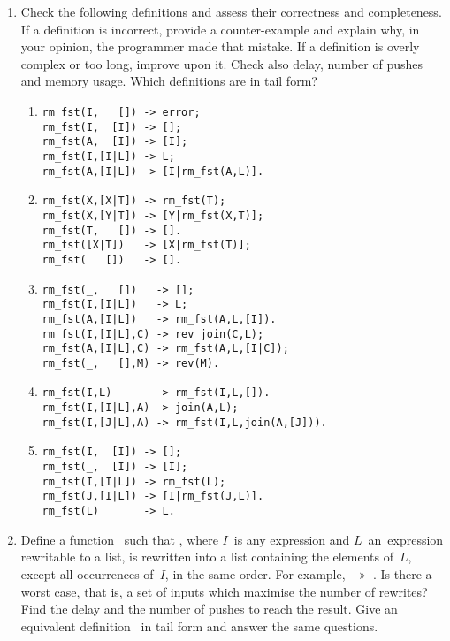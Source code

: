 \begin{enumerate}
  \item Check the following definitions and assess their correctness
    and completeness. If a definition is incorrect, provide a
    counter\hyp{}example and explain why, in your opinion, the
    programmer made that mistake. If a definition is overly complex or
    too long, improve upon it. Check also delay, number of pushes and
    memory usage. Which definitions are in tail form?
    \begin{enumerate}
      \item
\begin{verbatim}
rm_fst(I,   []) -> error;
rm_fst(I,  [I]) -> [];
rm_fst(A,  [I]) -> [I];
rm_fst(I,[I|L]) -> L;
rm_fst(A,[I|L]) -> [I|rm_fst(A,L)].
\end{verbatim}

\medskip

      \item
\begin{verbatim}
rm_fst(X,[X|T]) -> rm_fst(T);
rm_fst(X,[Y|T]) -> [Y|rm_fst(X,T)];
rm_fst(T,   []) -> [].
rm_fst([X|T])   -> [X|rm_fst(T)];
rm_fst(   [])   -> [].
\end{verbatim}

\medskip

      \item
\begin{verbatim}
rm_fst(_,   [])   -> [];
rm_fst(I,[I|L])   -> L;
rm_fst(A,[I|L])   -> rm_fst(A,L,[I]).
rm_fst(I,[I|L],C) -> rev_join(C,L);
rm_fst(A,[I|L],C) -> rm_fst(A,L,[I|C]);
rm_fst(_,   [],M) -> rev(M).
\end{verbatim}

\medskip

      \item
\begin{verbatim}
rm_fst(I,L)       -> rm_fst(I,L,[]).
rm_fst(I,[I|L],A) -> join(A,L);
rm_fst(I,[J|L],A) -> rm_fst(I,L,join(A,[J])).
\end{verbatim}

\medskip

      \item
\begin{verbatim}
rm_fst(I,  [I]) -> [];
rm_fst(_,  [I]) -> [I];
rm_fst(I,[I|L]) -> rm_fst(L);
rm_fst(J,[I|L]) -> [I|rm_fst(J,L)].
rm_fst(L)       -> L.
\end{verbatim}
    \end{enumerate}

  \item Define a function~ such that
    , where \(I\)~is any expression and
    \(L\)~an~expression rewritable to a list, is rewritten into a list
    containing the elements of~\(L\), except all occurrences of~\(I\),
    in the same order. For example, 
    \(\twoheadrightarrow\) \erlcode{[1,2]}. Is there a worst case,
    that is, a set of inputs which maximise the number of rewrites?
    Find the delay and the number of pushes to reach the result. Give
    an equivalent definition~ in tail form and
    answer the same questions.

\end{enumerate}
